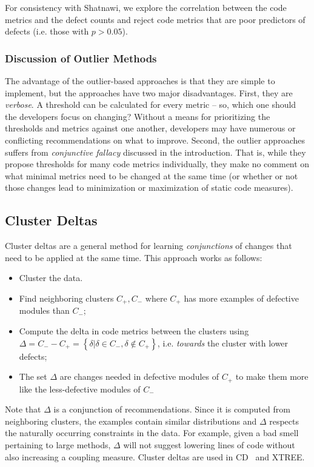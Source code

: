 \documentclass[twocolumn,5p]{elsarticle}
\theoremstyle{break}
\begin{document}
	For consistency with Shatnawi, we explore the correlation between the code metrics and the defect counts and  reject code metrics that are poor predictors of defects (i.e.   those  with $p > 0.05$).
	
	\subsubsection{Discussion of Outlier Methods}\label{sect:disc}
	The advantage of the outlier-based
	approaches is that they are simple to implement, but the approaches have   two  major disadvantages. 
	First, they are {\em verbose}. A threshold can be calculated for every metric -- so, which one should the developers focus on changing? Without a means for prioritizing the  thresholds and metrics against one another, developers may have numerous or conflicting recommendations on what to improve. Second, the outlier approaches suffers from {\em conjunctive fallacy}  discussed in the introduction. That is, while	they propose thresholds for many code metrics
	individually, they make no comment on what minimal metrics need to be changed at the same time (or whether or not those changes lead to minimization or maximization of static code measures).
	
	
	\subsection{Cluster Deltas}
	
	Cluster deltas are a general method
	for learning {\em conjunctions} of changes
	that need to be applied at the same time. 
	This approach works as follows:
	\begin{itemize}
		\item Cluster the data. 
		\item Find
		neighboring clusters $C_+,C_-$ where $C_+$ has more examples of defective
		modules than $C_-$;
		\item Compute the  delta   in code metrics between the clusters using \mbox{$\Delta = C_- - C_+ = \left\{\delta|\delta\in C_-, \delta \notin C_+\right\}$}, i.e.
		{\em towards} the cluster with lower defects;
		\item The set $\Delta$ are changes needed in defective modules of $C_+$ to
		make them more like the less-defective modules of $C_-$
	\end{itemize}
	Note that $\Delta$ is a conjunction of  recommendations.
	Since it is computed
	from neighboring clusters, the examples contain similar distributions and $\Delta$ respects the naturally occurring constraints in the data. For example,
	given a bad smell pertaining to large methods,   $\Delta$   will not  suggest lowering lines of code
	without also increasing a coupling measure. 
	Cluster deltas are used in CD~\cite{me12c} and XTREE.
	
\end{document}
